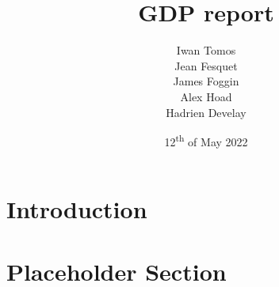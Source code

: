 \documentclass{article}
\title{GDP report}
\author{
    Iwan Tomos\\
    Jean Fesquet\\
    James Foggin\\
    Alex Hoad\\
    Hadrien Develay
}
\date{12\textsuperscript{th} of May 2022}
\begin{document}
\maketitle

\section{Introduction}


\section{Placeholder Section}

\end{document}
